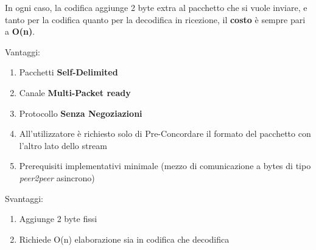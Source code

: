 In ogni caso, la codifica  aggiunge 2 byte extra al pacchetto che si vuole inviare, e tanto per la codifica quanto per la decodifica in ricezione, il \textbf{costo} è sempre pari a \textbf{O(n)}.

\begin{multicols}{2}
	\begin{center}
		{\large Vantaggi:}
	\end{center}
	\begin{spacing}{1.25}
		\begin{enumerate}[itemsep=-1mm]
			\item Pacchetti {\color{Azure}\textbf{Self-Delimited}}
			\item Canale {\color{Azure}\textbf{Multi-Packet ready}}
			\item Protocollo {\color{Azure}\textbf{Senza Negoziazioni}}
			\item All’utilizzatore è richiesto solo di Pre-Concordare il formato del pacchetto con l’altro lato dello stream
			\item Prerequisiti implementativi minimale (mezzo di comunicazione a bytes di tipo \textit{peer2peer} asincrono)
		\end{enumerate}
	\end{spacing}
	\vfill
	\columnbreak
	\begin{center}
		{\large Svantaggi:}
	\end{center}
	\begin{spacing}{1.25}
		\begin{enumerate}[itemsep=-1mm]
			\item Aggiunge 2 byte fissi
			\item Richiede O(n) elaborazione sia in codifica che decodifica
		\end{enumerate}
	\end{spacing}
	\vspace*{\fill}
\end{multicols}

\newpage

